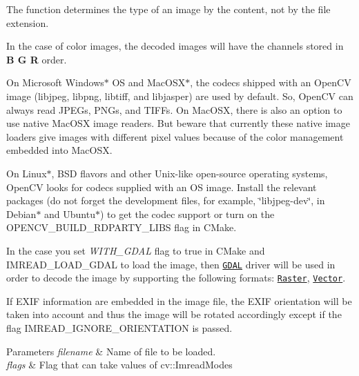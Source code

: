 \begin{DoxyItemize}
\item The function determines the type of an image by the content, not by the file extension.
\item In the case of color images, the decoded images will have the channels stored in {\bfseries B G R} order.
\item On Microsoft Windows$\ast$ OS and Mac\+O\+S\+X$\ast$, the codecs shipped with an Open\+CV image (libjpeg, libpng, libtiff, and libjasper) are used by default. So, Open\+CV can always read J\+P\+E\+Gs, P\+N\+Gs, and T\+I\+F\+Fs. On Mac\+O\+SX, there is also an option to use native Mac\+O\+SX image readers. But beware that currently these native image loaders give images with different pixel values because of the color management embedded into Mac\+O\+SX.
\item On Linux$\ast$, B\+SD flavors and other Unix-\/like open-\/source operating systems, Open\+CV looks for codecs supplied with an OS image. Install the relevant packages (do not forget the development files, for example, \char`\"{}libjpeg-\/dev\char`\"{}, in Debian$\ast$ and Ubuntu$\ast$) to get the codec support or turn on the O\+P\+E\+N\+C\+V\+\_\+\+B\+U\+I\+L\+D\+\_\+R\+D\+P\+A\+R\+T\+Y\+\_\+\+L\+I\+BS flag in C\+Make.
\item In the case you set {\itshape W\+I\+T\+H\+\_\+\+G\+D\+AL} flag to true in C\+Make and I\+M\+R\+E\+A\+D\+\_\+\+L\+O\+A\+D\+\_\+\+G\+D\+AL to load the image, then \href{http://www.gdal.org}{\tt G\+D\+AL} driver will be used in order to decode the image by supporting the following formats\+: \href{http://www.gdal.org/formats_list.html}{\tt Raster}, \href{http://www.gdal.org/ogr_formats.html}{\tt Vector}.
\item If E\+X\+IF information are embedded in the image file, the E\+X\+IF orientation will be taken into account and thus the image will be rotated accordingly except if the flag I\+M\+R\+E\+A\+D\+\_\+\+I\+G\+N\+O\+R\+E\+\_\+\+O\+R\+I\+E\+N\+T\+A\+T\+I\+ON is passed. 
\begin{DoxyParams}{Parameters}
{\em filename} & Name of file to be loaded. \\
\hline
{\em flags} & Flag that can take values of cv\+::\+Imread\+Modes \\
\hline
\end{DoxyParams}

\end{DoxyItemize}\mbox{\label{group__imgcodecs_ga4e94bb9f788558a0b9eb892cc7a33bb9}} 
